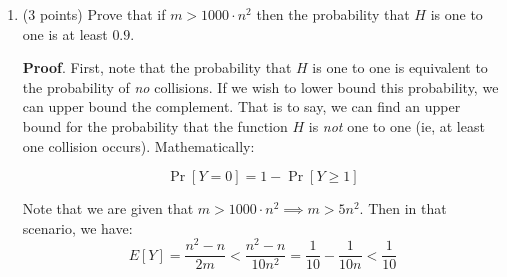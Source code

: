 \documentclass{article}
\begin{document}
\begin{enumerate}
\begin{enumerate}[,label=\alph*.]
\begin{mdbmarginx}{1ex}{0pt}{1ex}{0pt}%
\noindent{}\textbf{Proof}.  We simply use linearity of expectation and the results from part (a) above.%
\end{mdbmarginx}%
\noindent\noindent\[%
E[Y] = E\left[\sum_{i < j} X_{i,j}\right] = \sum_{i < j} E[X_{i,j}] = \frac{n(n-1)}{2m}
\]%

Note that the last line follows from the fact that the total number of summands such that 
$i < j \in \{1,\cdots, n\}$ is given by ${n \choose 2} = \frac{n(n-1)}{2}$ combined with 
the results from part (a). We can verify the claim made earlier too.%
\noindent\noindent\[%
m < n^2/1000 \implies E[Y] > \frac{n^2-n}{2n^2 / 1000} = 500(1 - \frac{1}{n}) > 1   
\]%

The above holds for all $n \in \mathbb{N}$. Additionally, note the $> 1$ lower bound is preserved as \mdbr
{}long as  $m < n^2/2$.
\mdfloatright{\ensuremath{\Box}}%

\item{}
(3 points) Prove that if $m > 1000\cdot n^2$ then the probability that $H$ is one to one is at 
least $0.9$.%

\begin{mdbmarginx}{1ex}{0pt}{1ex}{0pt}%
\noindent{}\textbf{Proof}.  First, note that the probability that $H$ is one to one is equivalent to the probability of \emph{no} 
collisions. If we wish to lower bound this probability, we can upper bound the complement. That is to 
say, we can find an upper bound for the probability that the function $H$ is \emph{not} one to one (ie, at 
least one collision occurs). Mathematically:%
\end{mdbmarginx}%
\noindent\noindent\[%
\Pr[Y = 0] = 1 - \Pr[Y \geq 1]
\]%

Note that we are given that $m > 1000\cdot n^2 \implies m > 5 n^2$. Then in that scenario, we have:%
\noindent\noindent\[%
E[Y] = \frac{n^2-n}{2m} < \frac{n^2 - n}{10 n^2} = \frac{1}{10} - \frac{1}{10n} < \frac{1}{10}
\]%


\end{enumerate}
\end{enumerate}
\end{document}
